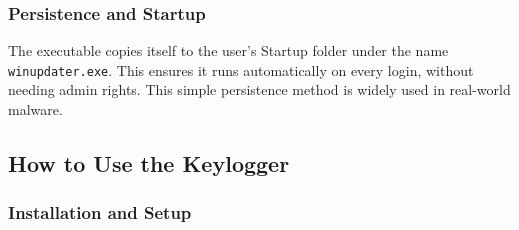 \subsubsection{Persistence and Startup}
The executable copies itself to the user's Startup folder under the name \texttt{winupdater.exe}. This ensures it runs automatically on every login, without needing admin rights. This simple persistence method is widely used in real-world malware.

\subsection{How to Use the Keylogger}

\subsubsection{Installation and Setup}

